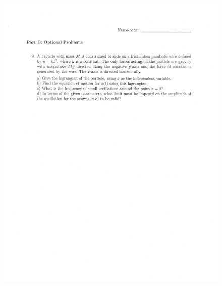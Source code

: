 \documentclass[10pt,a4paper]{article}
\begin{document}
\begin{figure}[H]
 \centering
 \includegraphics[width=16cm]{pdf/1-1T60.png}
\end{figure}
 \newpage
\end{document}

